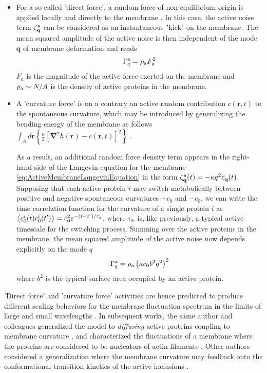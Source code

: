 \documentclass[graybox]{svmult}
\begin{document}
\begin{itemize}
	
	\item For a so-called 'direct force', a random force of non-equilibrium origin is applied locally and directly to the membrane \cite{Gov:2004}. In this case, the active noise term $\zeta^{\rm{a}}_{\mathbf{q}}$ can be considered as an instantaneous "kick" on the membrane. The mean squared amplitude of the active noise is then independent of the mode $\mathbf{q}$ of membrane deformation and reads
	\begin{equation}
	\Gamma^{\rm{a}}_q = \rho_{\rm{a}}F_{\rm{a}}^2
	\label{eq:Direct_Active_Force}
	\end{equation}
	$F_a$ is the magnitude of the active force exerted on the membrane and $\rho_{\rm{a}} \sim N / A$ is the density of active proteins in the membrane.
	\\
	\item A 'curvature force' is on a contrary an active random contribution $c(\mathbf{r},t)$ to the spontaneous curvature, which may be introduced by generalizing the bending energy of the membrane as follows $\int_Ad\mathbf{r}\left\lbrace \frac{\kappa}{2}\left[\boldsymbol{\nabla}^2h(\mathbf{r}) - c(\mathbf{r},t) \right]^2\right\rbrace$ \cite{Lin:2006}.
	
	As a result, an additional random force density term appears in the right-hand side of the Langevin equation for the membrane \eqref{eq:ActiveMembraneLangevinEquation} in the form $\zeta^{\rm{a}}_{\mathbf{q}}(t) = - \kappa q^2 c_{\mathbf{q}}(t)$. Supposing that each active protein $i$ may switch metabolically between positive and negative spontaneous curvatures $+c_0$ and $-c_0$, we can write the time correlation function for the curvature of a single protein $i$ as $\left\langle c^i_0(t) c^i_0(t')\right\rangle = c_0^2 e^{-(t-t')/\tau_{\rm{a}}}$, where $\tau_{\rm{a}}$ is, like previously, a typical active timescale for the switching process. Summing over the active proteins in the membrane, the mean squared amplitude of the active noise now depends explicitly on the mode $q$
	\begin{equation}
	\Gamma^{\rm{a}}_q = \rho_{\rm{a}}\left(\kappa c_0 b^2q^2\right)^2
	\end{equation}	  
where $b^2$ is the typical surface area occupied by an active protein.

\end{itemize}
'Direct force' and 'curvature force' activities are hence predicted to produce different scaling behaviors for the membrane fluctuation spectrum in the limits of large and small wavelengths \cite{Gov:2004}. In subsequent works, the same author and colleagues generalized the model to \emph{diffusing} active proteins coupling to membrane curvature \cite{Lin:2006}, and characterized the fluctuations of a membrane where the proteins are considered to be nucleators of actin filaments \cite{Gov:2006}. Other authors considered a generalization where the membrane curvature may feedback onto the conformational transition kinetics of the active inclusions \cite{Chen:2010}. 
\\
\end{document}
